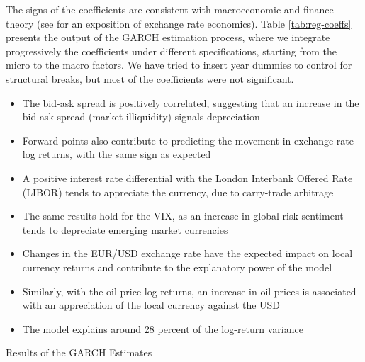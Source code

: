 \documentclass[11pt]{article}
\newcommand{\source}[1]{\caption*{\raggedright \small {#1} \normalsize}} %
\begin{document}
The signs  of the coefficients  are consistent with macroeconomic  and finance
theory   (see   \cite{sarno2003}   for   an  exposition   of   exchange   rate
economics).  Table  \ref{tab:reg-coeffs}  presents  the output  of  the  GARCH
estimation process,  where we  integrate progressively the  coefficients under
different specifications,  starting from  the micro to  the macro  factors. We
have tried to  insert year dummies to control for  structural breaks, but most
of the coefficients were not significant.\\

\begin{itemize}
\item The bid-ask spread is positively correlated, suggesting that an increase
  in the bid-ask spread (market illiquidity) signals depreciation
  
\item Forward points also contribute to predicting the movement in exchange
  rate log returns, with the same sign as expected
  
\item A positive interest rate differential with the London Interbank Offered
  Rate (LIBOR) tends to appreciate the currency, due to carry-trade arbitrage
  
\item The same results hold for the VIX, as an
  increase in global risk sentiment tends to depreciate emerging market
  currencies

\item Changes in  the EUR/USD exchange rate have the  expected impact on local
currency returns and contribute to the explanatory power of the model
  
\item Similarly, with the oil price log  returns, an increase in oil prices is
associated with an appreciation of the local currency against the USD

  
\item The model explains around 28 percent of the log-return variance
\end{itemize}

\begin{table}
  \begin{center}
    \caption{Results of the GARCH Estimates} %
    
\label{tab:reg-coeffs}
\end{center}
\end{table}
\end{document}
